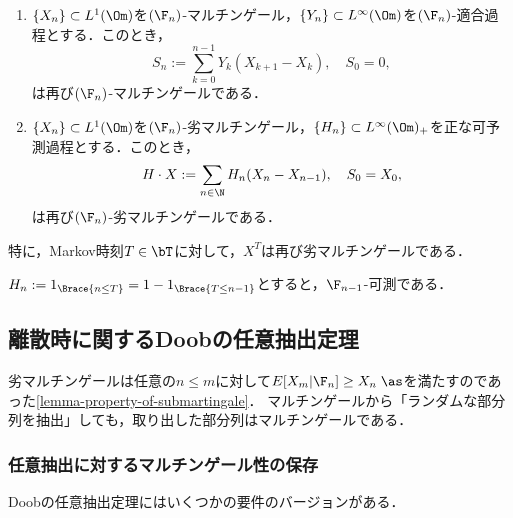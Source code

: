 \documentclass[uplatex,dvipdfmx]{jsreport}
\begin{document}
\begin{theorem}\mbox{}
    \begin{enumerate}
        \item $\{X_n\}\subset L^1(\Om)$を$(\F_n)$-マルチンゲール，$\{Y_n\}\subset L^\infty(\Om)$を$(\F_n)$-適合過程とする．このとき，
        \[S_n:=\sum_{k=0}^{n-1}Y_k(X_{k+1}-X_k),\quad S_0=0,\]
        は再び$(\F_n)$-マルチンゲールである．
        \item $\{X_n\}\subset L^1(\Om)$を$(\F_n)$-劣マルチンゲール，$\{H_n\}\subset L^\infty(\Om)_+$を正な可予測過程とする．このとき，
        \[H\cdot X:=\sum_{n\in\N}H_n(X_n-X_{n-1}),\quad S_0=X_0,\]
        は再び$(\F_n)$-劣マルチンゲールである．
    \end{enumerate}
\end{theorem}

\begin{corollary}
    特に，Markov時刻$T\in\bT$に対して，$X^T$は再び劣マルチンゲールである．
\end{corollary}
\begin{Proof}
    $H_n:=1_{\Brace{n\le T}}=1-1_{\Brace{T\le n-1}}$とすると，$\F_{n-1}$-可測である．
\end{Proof}

\subsection{離散時に関するDoobの任意抽出定理}

\begin{tcolorbox}[colframe=ForestGreen, colback=ForestGreen!10!white,breakable,colbacktitle=ForestGreen!40!white,coltitle=black,fonttitle=\bfseries\sffamily,
title=]
    劣マルチンゲールは任意の$n\le m$に対して$E[X_m|\F_n]\ge X_n\;\as$を満たすのであった\ref{lemma-property-of-submartingale}．
    マルチンゲールから「ランダムな部分列を抽出」しても，取り出した部分列はマルチンゲールである．
\end{tcolorbox}

\subsubsection{任意抽出に対するマルチンゲール性の保存}

\begin{tcolorbox}[colframe=ForestGreen, colback=ForestGreen!10!white,breakable,colbacktitle=ForestGreen!40!white,coltitle=black,fonttitle=\bfseries\sffamily,
title=]
    Doobの任意抽出定理にはいくつかの要件のバージョンがある．
\end{tcolorbox}
\end{document}
